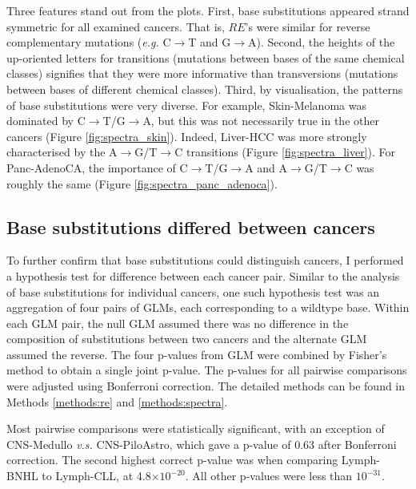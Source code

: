 

Three features stand out from the plots. First, base substitutions appeared strand symmetric for all examined cancers. That is, $RE$'s were similar for reverse complementary mutations (\textit{e.g.} C$\rightarrow$T and G$\rightarrow$A). Second, the heights of the up-oriented letters for \glspl{transition} (mutations between bases of the same chemical classes) signifies that they were more informative than \glspl{transversion} (mutations between bases of different chemical classes). Third, by visualisation, the patterns of base substitutions were very diverse. For example, Skin-Melanoma was dominated by C$\rightarrow$T/G$\rightarrow$A, but this was not necessarily true in the other cancers (Figure \ref{fig:spectra_skin}). Indeed, Liver-HCC was more strongly characterised by the A$\rightarrow$G/T$\rightarrow$C transitions (Figure \ref{fig:spectra_liver}). For Panc-AdenoCA, the importance of C$\rightarrow$T/G$\rightarrow$A and A$\rightarrow$G/T$\rightarrow$C was roughly the same (Figure \ref{fig:spectra_panc_adenoca}).



\subsection{Base substitutions differed between cancers}\label{sce:paired_spectra}
To further confirm that base substitutions could distinguish cancers, I performed a hypothesis test for difference between each cancer pair. Similar to the analysis of base substitutions for individual cancers, one such hypothesis test was an aggregation of four pairs of GLMs, each corresponding to a wildtype base. Within each GLM pair, the null GLM assumed there was no difference in the composition of substitutions between two cancers and the alternate GLM assumed the reverse. The four p-values from GLM were combined by Fisher's method to obtain a single joint p-value. The p-values for all pairwise comparisons were adjusted using Bonferroni correction. The detailed methods can be found in Methods \ref{methods:re} and \ref{methods:spectra}.

Most pairwise comparisons were statistically significant, with an exception of CNS-Medullo \textit{v.s.} CNS-PiloAstro, which gave a p-value of 0.63 after Bonferroni correction. The second highest correct p-value was when comparing Lymph-BNHL to Lymph-CLL, at 4.8$\times10^{-20}$. All other p-values were less than $10^{-31}$. 

